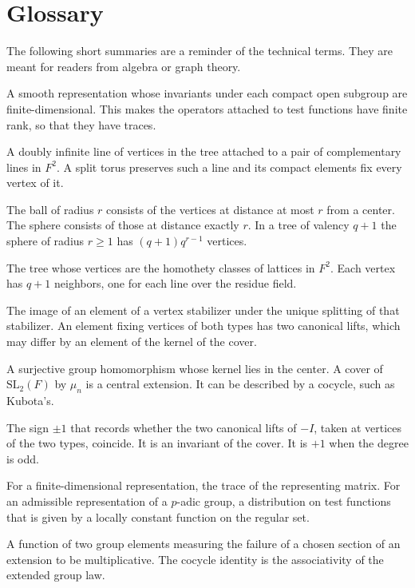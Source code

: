 \documentclass[12pt,letterpaper]{article}
\numberwithin{equation}{section}
\theoremstyle{definition}
\theoremstyle{remark}
\begin{document}
\section*{Glossary}
The following short summaries are a reminder of the technical terms. They are meant for readers from algebra or graph theory.
\begin{description}[style=nextline,leftmargin=1.5em]
\item[Admissible representation] A smooth representation whose invariants under each compact open subgroup are finite-dimensional. This makes the operators attached to test functions have finite rank, so that they have traces.
\item[Apartment] A doubly infinite line of vertices in the tree attached to a pair of complementary lines in $F^2$. A split torus preserves such a line and its compact elements fix every vertex of it.
\item[Ball and sphere] The ball of radius $r$ consists of the vertices at distance at most $r$ from a center. The sphere consists of those at distance exactly $r$. In a tree of valency $q+1$ the sphere of radius $r\ge1$ has $(q+1)q^{r-1}$ vertices.
\item[Bruhat--Tits tree] The tree whose vertices are the homothety classes of lattices in $F^2$. Each vertex has $q+1$ neighbors, one for each line over the residue field.
\item[Canonical lift] The image of an element of a vertex stabilizer under the unique splitting of that stabilizer. An element fixing vertices of both types has two canonical lifts, which may differ by an element of the kernel of the cover.
\item[Central extension] A surjective group homomorphism whose kernel lies in the center. A cover of $\mathrm{SL}_2(F)$ by $\mu_n$ is a central extension. It can be described by a cocycle, such as Kubota's.
\item[Central sign] The sign $\pm1$ that records whether the two canonical lifts of $-I$, taken at vertices of the two types, coincide. It is an invariant of the cover. It is $+1$ when the degree is odd.
\item[Character] For a finite-dimensional representation, the trace of the representing matrix. For an admissible representation of a $p$-adic group, a distribution on test functions that is given by a locally constant function on the regular set.
\item[Cocycle] A function of two group elements measuring the failure of a chosen section of an extension to be multiplicative. The cocycle identity is the associativity of the extended group law.

\end{description}
\end{document}
